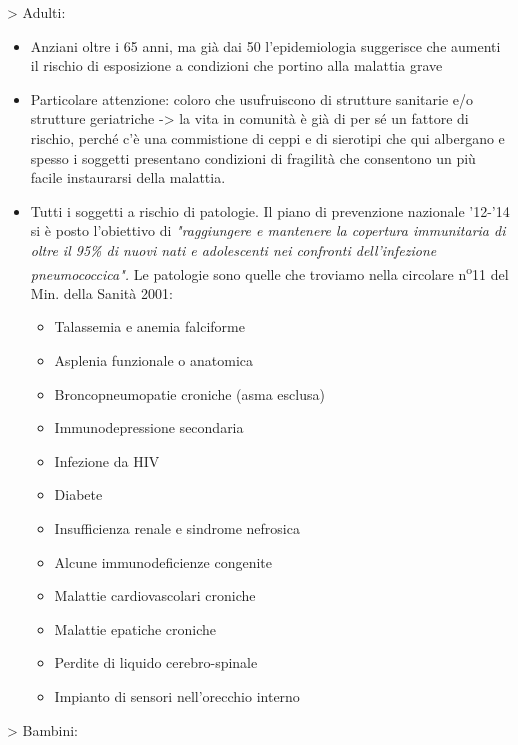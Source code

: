   > Adulti:

\begin{itemize}
\item
  Anziani oltre i 65 anni, ma già dai 50 l'epidemiologia suggerisce che
  aumenti il rischio di esposizione a condizioni che portino alla
  malattia grave
\item
  Particolare attenzione: coloro che usufruiscono di strutture sanitarie
  e/o strutture geriatriche -> la vita in comunità è già di per sé un
  fattore di rischio, perché c'è una commistione di ceppi e di sierotipi
  che qui albergano e spesso i soggetti presentano condizioni di
  fragilità che consentono un più facile instaurarsi della malattia.
\item
  Tutti i soggetti a rischio di patologie. Il piano di prevenzione
  nazionale '12-'14 si è posto l'obiettivo di \emph{"raggiungere e
  mantenere la copertura immunitaria di oltre il 95\% di nuovi nati e
  adolescenti nei confronti dell'infezione pneumococcica".} Le patologie
  sono quelle che troviamo nella circolare n\textsuperscript{o}11 del Min. della Sanità
  2001:
\begin{itemize}
\item Talassemia e anemia falciforme
\item Asplenia funzionale o anatomica
\item Broncopneumopatie croniche (asma esclusa)
\item Immunodepressione secondaria
\item Infezione da HIV
\item Diabete
\item Insufficienza renale e sindrome nefrosica
\item Alcune immunodeficienze congenite
\item Malattie cardiovascolari croniche
\item Malattie epatiche croniche
\item Perdite di liquido cerebro-spinale
\item Impianto di sensori nell'orecchio interno
\end{itemize}
\end{itemize}

  > Bambini:

